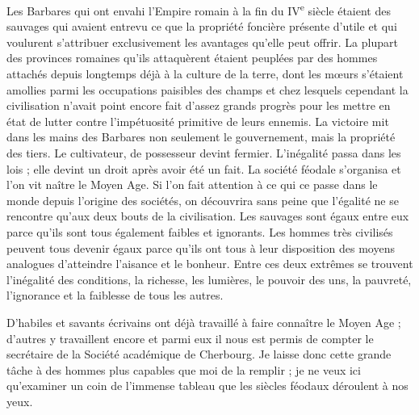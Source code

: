 \documentclass[french,twoside]{book} %
\newcommand{\astermono}{\medskip\centerline{\color{rubric}\large\selectfont{\syms ✻}}\medskip\par}%
\begin{document}
Les Barbares qui ont envahi l’Empire romain à la fin du IV\textsuperscript{e} siècle étaient des sauvages qui avaient entrevu ce que la propriété foncière présente d’utile et qui voulurent s’attribuer exclusivement les avantages qu’elle peut offrir. La plupart des provinces romaines qu’ils attaquèrent étaient peuplées par des hommes attachés depuis longtemps déjà à la culture de la terre, dont les mœurs s’étaient amollies parmi les occupations paisibles des champs et chez lesquels cependant la civilisation n’avait point encore fait d’assez grands progrès pour les mettre en état de lutter contre l’impétuosité primitive de leurs ennemis. La victoire mit dans les mains des Barbares non seulement le gouvernement, mais la propriété des tiers. Le cultivateur, de possesseur devint fermier. L'inégalité passa dans les lois ; elle devint un droit après avoir été un fait. La société féodale s’organisa et l’on vit naître le Moyen Age. Si l’on fait attention à ce qui ce passe dans le monde depuis l’origine des sociétés, on découvrira sans peine que l’égalité ne se rencontre qu’aux deux bouts de la civilisation. Les sauvages sont égaux entre eux parce qu’ils sont tous également faibles et ignorants. Les hommes très civilisés peuvent tous devenir égaux parce qu’ils ont tous à leur disposition des moyens analogues d’atteindre l’aisance et le bonheur. Entre ces deux extrêmes se trouvent l’inégalité des conditions, la richesse, les lumières, le pouvoir des uns, la pauvreté, l’ignorance et la faiblesse de tous les autres.\par
D'habiles et savants écrivains ont déjà travaillé à faire connaître le Moyen Age ; d’autres y travaillent encore et parmi eux il nous est permis de compter le secrétaire de la Société académique de Cherbourg. Je laisse donc cette grande tâche à des hommes plus capables que moi de la remplir ; je ne veux ici qu’examiner un coin de l’immense tableau que les siècles féodaux déroulent à nos yeux.\par

\astermono
\end{document}
